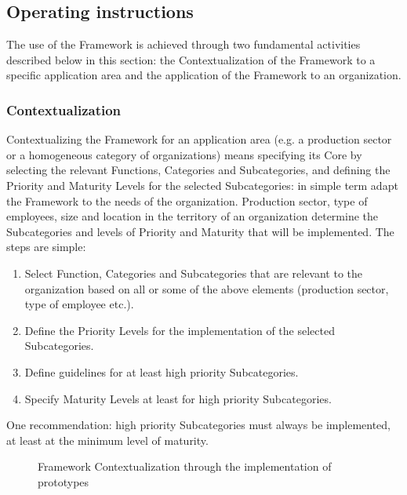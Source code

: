 \subsection{Operating instructions}
The use of the Framework is achieved through two fundamental activities described below in this section: the Contextualization of the Framework to a specific application area and the application of the Framework to an organization.
\subsubsection{Contextualization}
Contextualizing the Framework for an application area (e.g. a production sector or a homogeneous category of organizations) means specifying its Core by selecting the relevant Functions, Categories and Subcategories, and defining the Priority and Maturity Levels for the selected Subcategories: in simple term adapt the Framework to the needs of the organization. Production sector, type of employees, size and location in the territory of an organization determine the Subcategories and levels of Priority and Maturity that will be implemented. The steps are simple:
\begin{enumerate}
\itemsep0em
    \item Select Function, Categories and Subcategories that are relevant to the organization based on all or some of the above elements (production sector, type of employee etc.).
    \item Define the Priority Levels for the implementation of the selected Subcategories.
    \item Define guidelines for at least high priority Subcategories.
    \item Specify Maturity Levels at least for high priority Subcategories.
\end{enumerate}
One recommendation: high priority Subcategories must always be implemented, at least at the minimum level of maturity.\newline
\begin{figure}[H]
  \centering
  
  \caption{Framework Contextualization through the implementation of prototypes}
\end{figure}
\noindent
